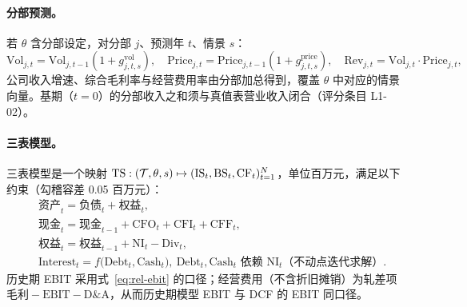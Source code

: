 \paragraph{分部预测。}
若 $\theta$ 含分部设定，对分部 $j$、预测年 $t$、情景 $s$：
\[
\text{Vol}_{j,t}=\text{Vol}_{j,t-1}(1+g^{\text{vol}}_{j,t,s}),\quad
\text{Price}_{j,t}=\text{Price}_{j,t-1}(1+g^{\text{price}}_{j,t,s}),\quad
\text{Rev}_{j,t}=\text{Vol}_{j,t}\cdot\text{Price}_{j,t},
\]
公司收入增速、综合毛利率与经营费用率由分部加总得到，覆盖 $\theta$ 中对应的情景向量。基期（$t=0$）的分部收入之和须与真值表营业收入闭合（评分条目 L1-02）。

\paragraph{三表模型。}
三表模型是一个映射 $\operatorname{TS}:(\mathcal{T},\theta,s)\mapsto (\text{IS}_t,\text{BS}_t,\text{CF}_t)_{t=1}^{N}$，单位百万元，满足以下约束（勾稽容差 0.05 百万元）：
\begin{align}
&\text{资产}_t = \text{负债}_t + \text{权益}_t, \label{eq:prob-bs}\\
&\text{现金}_t = \text{现金}_{t-1} + \text{CFO}_t + \text{CFI}_t + \text{CFF}_t, \label{eq:prob-cash}\\
&\text{权益}_t = \text{权益}_{t-1} + \text{NI}_t - \text{Div}_t, \label{eq:prob-re}\\
&\text{Interest}_t = f\big(\text{Debt}_t,\text{Cash}_t\big),\ \text{Debt}_t,\text{Cash}_t \text{ 依赖 } \text{NI}_t \text{（不动点迭代求解）}. \label{eq:prob-fixpoint}
\end{align}
历史期 EBIT 采用式~\eqref{eq:rel-ebit} 的口径；经营费用（不含折旧摊销）为轧差项 $\text{毛利}-\text{EBIT}-\text{D\&A}$，从而历史期模型 EBIT 与 DCF 的 EBIT 同口径。

